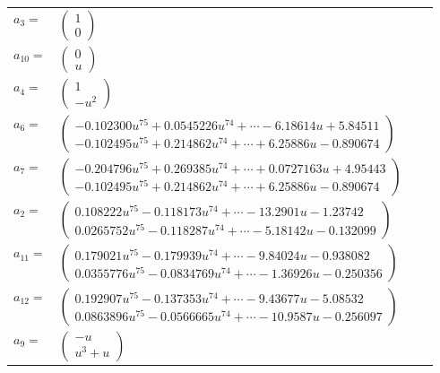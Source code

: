 \documentclass[1p]{elsarticle_modified}
\theoremstyle{definition}
\begin{document}
\begin{tabular}{m{7pt} m{180pt} m{7pt} m{180pt} }
\flushright $a_{3}=$&$\begin{pmatrix}1\\0\end{pmatrix}$ \\
\flushright $a_{10}=$&$\begin{pmatrix}0\\u\end{pmatrix}$ \\
\flushright $a_{4}=$&$\begin{pmatrix}1\\- u^2\end{pmatrix}$ \\
\flushright $a_{6}=$&$\begin{pmatrix}-0.102300 u^{75}+0.0545226 u^{74}+\cdots-6.18614 u+5.84511\\-0.102495 u^{75}+0.214862 u^{74}+\cdots+6.25886 u-0.890674\end{pmatrix}$ \\
\flushright $a_{7}=$&$\begin{pmatrix}-0.204796 u^{75}+0.269385 u^{74}+\cdots+0.0727163 u+4.95443\\-0.102495 u^{75}+0.214862 u^{74}+\cdots+6.25886 u-0.890674\end{pmatrix}$ \\
\flushright $a_{2}=$&$\begin{pmatrix}0.108222 u^{75}-0.118173 u^{74}+\cdots-13.2901 u-1.23742\\0.0265752 u^{75}-0.118287 u^{74}+\cdots-5.18142 u-0.132099\end{pmatrix}$ \\
\flushright $a_{11}=$&$\begin{pmatrix}0.179021 u^{75}-0.179939 u^{74}+\cdots-9.84024 u-0.938082\\0.0355776 u^{75}-0.0834769 u^{74}+\cdots-1.36926 u-0.250356\end{pmatrix}$ \\
\flushright $a_{12}=$&$\begin{pmatrix}0.192907 u^{75}-0.137353 u^{74}+\cdots-9.43677 u-5.08532\\0.0863896 u^{75}-0.0566665 u^{74}+\cdots-10.9587 u-0.256097\end{pmatrix}$ \\
\flushright $a_{9}=$&$\begin{pmatrix}- u\\u^3+u\end{pmatrix}$ \\

\end{tabular}
\end{document}

